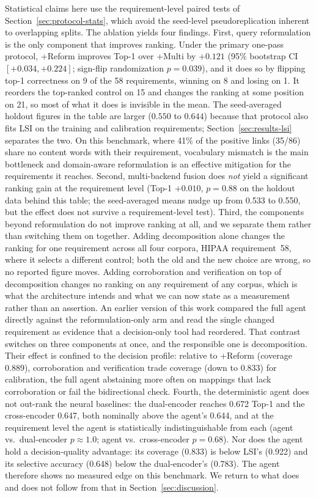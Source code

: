 \documentclass[smallextended,natbib]{svjour3}
\begin{document}
Statistical claims here use the requirement-level paired tests of Section~\ref{sec:protocol-stats}, which avoid the seed-level pseudoreplication inherent to overlapping splits.
The ablation yields four findings.
First, query reformulation is the only component that improves ranking. Under the primary one-pass protocol, +Reform improves Top-1 over +Multi by $+0.121$ (95\% bootstrap CI $[+0.034, +0.224]$; sign-flip randomization $p = 0.039$), and it does so by flipping top-1 correctness on 9 of the 58 requirements, winning on 8 and losing on 1. It reorders the top-ranked control on 15 and changes the ranking at some position on 21, so most of what it does is invisible in the mean. The seed-averaged holdout figures in the table are larger ($0.550$ to $0.644$) because that protocol also fits LSI on the training and calibration requirements; Section~\ref{sec:results-lsi} separates the two.
On this benchmark, where 41\% of the positive links (35/86) share no content words with their requirement, vocabulary mismatch is the main bottleneck and domain-aware reformulation is an effective mitigation for the requirements it reaches.
Second, multi-backend fusion does \emph{not} yield a significant ranking gain at the requirement level (Top-1 $+0.010$, $p = 0.88$ on the holdout data behind this table; the seed-averaged means nudge up from 0.533 to 0.550, but the effect does not survive a requirement-level test).
Third, the components beyond reformulation do not improve ranking at all, and we separate them rather than switching them on together. Adding decomposition alone changes the ranking for one requirement across all four corpora, HIPAA requirement~58, where it selects a different control; both the old and the new choice are wrong, so no reported figure moves. Adding corroboration and verification on top of decomposition changes no ranking on any requirement of any corpus, which is what the architecture intends and what we can now state as a measurement rather than an assertion. An earlier version of this work compared the full agent directly against the reformulation-only arm and read the single changed requirement as evidence that a decision-only tool had reordered. That contrast switches on three components at once, and the responsible one is decomposition. Their effect is confined to the decision profile: relative to +Reform (coverage 0.889), corroboration and verification trade coverage (down to 0.833) for calibration, the full agent abstaining more often on mappings that lack corroboration or fail the bidirectional check.
Fourth, the deterministic agent does not out-rank the neural baselines: the dual-encoder reaches 0.672 Top-1 and the cross-encoder 0.647, both nominally above the agent's 0.644, and at the requirement level the agent is statistically indistinguishable from each (agent vs.\ dual-encoder $p \approx 1.0$; agent vs.\ cross-encoder $p = 0.68$). Nor does the agent hold a decision-quality advantage: its coverage (0.833) is below LSI's (0.922) and its selective accuracy (0.648) below the dual-encoder's (0.783). The agent therefore shows no measured edge on this benchmark. We return to what does and does not follow from that in Section~\ref{sec:discussion}.
\end{document}
